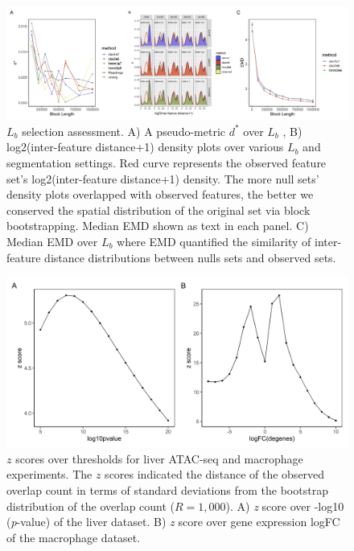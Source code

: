 \documentclass{article}
\begin{document}
\begin{figure}[htbp]
\centering
\includegraphics[scale=0.35]{Figures/sfig1.jpeg}
\caption{$L_b$ selection assessment. A) A pseudo-metric $d^*$
  \citep{bickel2010subsampling} over $L_b$ , B) 
  log2(inter-feature distance+1) density plots over various $L_b$ and
  segmentation settings. Red curve represents the observed
   feature set's
  log2(inter-feature distance+1) density. The more 
  null sets' density
  plots overlapped with observed features, the better we conserved the
  spatial distribution of the original set via block
  bootstrapping. Median EMD shown as text in each panel. C) Median
  EMD over $L_b$ where EMD quantified the similarity of inter-feature
  distance distributions between  nulls sets and observed sets.}
\label{fig:suppfig0}
\end{figure}

\begin{figure}[htbp]
\centering
\includegraphics[scale=0.3]{Figures/zscore.jpeg}
\caption{
  $z$ scores over thresholds for liver ATAC-seq and macrophage experiments.
  The $z$ scores indicated the distance of the observed overlap
  count in terms of standard deviations from the 
  bootstrap distribution of the overlap count ($R = 1,000$).
  A) \textit{z} score over -log10 (\textit{p}-value)  of the liver
  dataset. B) \textit{z} score over gene expression logFC of the
  macrophage dataset.}
\label{fig:suppfig2}
\end{figure}
\end{document}
